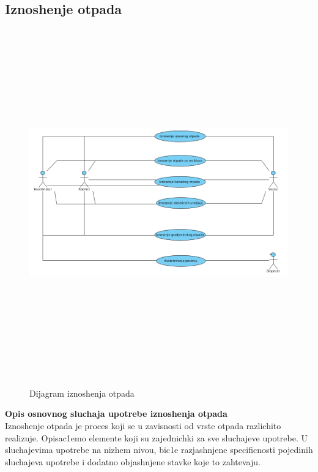 \documentclass[10 pt]{article}
\begin{document}
	
	\subsection{Iznoshenje otpada}
	
	\begin{figure}[H]
		\centering
		\includegraphics[width=15cm,height=15cm,keepaspectratio]{slike/UCIznosenjeSmeca.png}\\
		\caption{Dijagram iznoshenja otpada}
	\end{figure}

	\textbf{Opis osnovnog sluchaja upotrebe iznoshenja otpada}\\
		
	Iznoshenje otpada je proces koji se u zavisnosti od vrste otpada razlichito realizuje.
	Opisac1emo elemente koji su zajednichki za sve sluchajeve upotrebe.
	U sluchajevima upotrebe na nizhem nivou, bic1e razjashnjene specificnosti
	pojedinih sluchajeva upotrebe i dodatno objashnjene stavke koje to zahtevaju.
	
\end{document}

